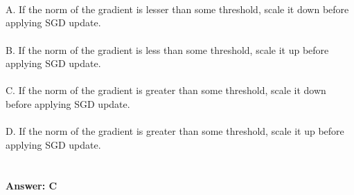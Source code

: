 \documentclass[prl,twocolumn,showpacs,preprintnumbers,superscriptaddress]{revtex4}
\theoremstyle{plain}
\theoremstyle{definition}
\begin{document}
\begin{widetext}
\\
\\
\\
A. If the norm of the gradient is lesser than some threshold, scale it down before applying SGD update.
\\
\\
B. If the norm of the gradient is less than some threshold, scale it up before applying SGD update.
\\
\\
C. If the norm of the gradient is greater than some threshold, scale it down before applying SGD update.
\\
\\
D. If the norm of the gradient is greater than some threshold, scale it up before applying SGD update.
\\
\\
\\
\textbf{Answer: C}
\\
\\
\\
\\
\\
\\
\end{widetext}
\end{document}
